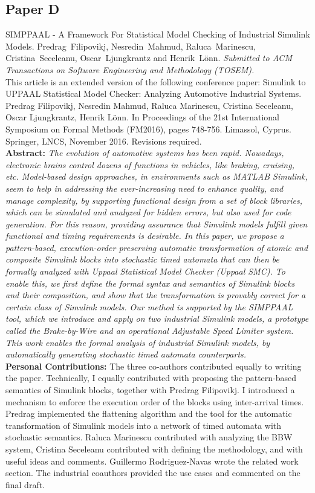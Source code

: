 \subsection*{Paper D}
SIMPPAAL - A Framework For Statistical Model Checking of Industrial Simulink Models. Predrag~Filipovikj, Nesredin~Mahmud, Raluca~Marinescu, Cristina~Seceleanu, Oscar~Ljungkrantz and Henrik~L\"{o}nn. \textit{Submitted to ACM Transactions on Software Engineering and Methodology (TOSEM).}\label{lbl_simulink_ilp}
\\[3pt]{\footnotesize This article is an extended version of the following conference paper:
     Simulink to UPPAAL Statistical Model Checker: Analyzing Automotive Industrial Systems.
Predrag Filipovikj, Nesredin Mahmud, Raluca Marinescu, Cristina Seceleanu, Oscar Ljungkrantz, Henrik L{\"o}nn. In Proceedings of the 21st International
Symposium on Formal Methods (FM2016), pages 748-756. Limassol, Cyprus. Springer, LNCS, November 2016. Revisions required. }\\[6pt]%
	\noindent \textbf{Abstract:} \textit{The evolution of automotive systems has been rapid. Nowadays, electronic brains control dozens of functions in vehicles, like
		braking, cruising, etc. Model-based design approaches, in environments such as MATLAB Simulink, seem to help in addressing
		the ever-increasing need to enhance quality, and manage complexity, by supporting functional design from a set of block
		libraries, which can be simulated and analyzed for hidden errors, but also used for code generation. For this reason, providing
		assurance that Simulink models fulfill given functional and timing requirements is desirable. In this paper, we propose a
		pattern-based, execution-order preserving automatic transformation of atomic and composite Simulink blocks into stochastic
		timed automata that can then be formally analyzed with Uppaal Statistical Model Checker (Uppaal SMC). To enable this, we
		first define the formal syntax and semantics of Simulink blocks and their composition, and show that the transformation is
		provably correct for a certain class of Simulink models. Our method is supported by the SIMPPAAL tool, which we introduce
		and apply on two industrial Simulink models, a prototype called the Brake-by-Wire and an operational Adjustable Speed
		Limiter system. This work enables the formal analysis of industrial Simulink models, by automatically generating stochastic
		timed automata counterparts.}\\[6pt]%
	\textbf{Personal Contributions: } The three co-authors contributed equally to writing the paper. Technically, I equally contributed with proposing the pattern-based semantics of Simulink blocks, together with Predrag Filipovikj. I introduced a mechanism to enforce the execution order of the blocks using inter-arrival times. Predrag implemented the flattening algorithm and the tool for the automatic transformation of Simulink models into a network of timed automata with stochastic semantics. Raluca Marinescu contributed with analyzing the BBW system, Cristina Seceleanu contributed with defining the methodology, and with useful ideas and comments. Guillermo Rodriguez-Navas wrote the related work section. The industrial coauthors provided the use cases and commented on the final draft.\\
